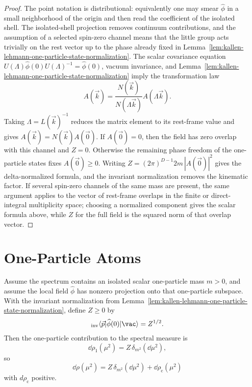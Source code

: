 \begin{proof}
The point notation is distributional: equivalently one may smear
\(\widehat\phi\) in a small neighborhood of the origin and then read the
coefficient of the isolated shell.  The isolated-shell projection removes
continuum contributions, and the assumption of a selected spin-zero channel
means that the little group acts trivially on the rest vector up to the phase
already fixed in
Lemma~\ref{lem:kallen-lehmann-one-particle-state-normalization}.
The scalar covariance equation
\(U(\Lambda)\widehat\phi(0)U(\Lambda)^{-1}=\widehat\phi(0)\), vacuum
invariance, and
Lemma~\ref{lem:kallen-lehmann-one-particle-state-normalization} imply
the transformation law
\[
  A(\vec k)
  =
  \frac{N(\vec k)}{N(\Lambda\vec k)}
  A(\Lambda\vec k).
\]
Taking
\(\Lambda=L(\vec k)^{-1}\) reduces the matrix element to its rest-frame value
and gives \(A(\vec k)=N(\vec k)A(\vec0)\).  If \(A(\vec0)=0\), then the field
has zero overlap with this channel and \(Z=0\).  Otherwise the remaining phase
freedom of the one-particle states fixes \(A(\vec0)\ge0\).  Writing
\(Z=(2\pi)^{D-1}2m\,|A(\vec0)|^2\) gives the delta-normalized formula, and
the invariant normalization removes the kinematic factor.  If several
spin-zero channels of the same mass are present, the same argument applies to
the vector of rest-frame overlaps in the finite or direct-integral
multiplicity space; choosing a normalized component gives the scalar formula
above, while \(Z\) for the full field is the squared norm of that overlap
vector.
\end{proof}

\section{One-Particle Atoms}

\begin{proposition}
\label{prop:kallen-lehmann-one-particle-atom}
Assume the spectrum contains an isolated scalar one-particle mass \(m>0\), and
assume the local field \(\widehat\phi\) has nonzero projection onto that
one-particle subspace.  With the invariant normalization from
Lemma~\ref{lem:kallen-lehmann-one-particle-state-normalization}, define
\(Z\ge0\) by
\[
  {}_{\rm inv}\langle\vec p|\widehat\phi(0)|\vac\rangle=Z^{1/2}.
\]
Then the one-particle contribution to the spectral measure is
\[
  \dd\rho_1(\mu^2)=Z\,\delta_{m^2}(\dd\mu^2),
\]
so
\[
  \dd\rho(\mu^2)
  =
  Z\,\delta_{m^2}(\dd\mu^2)
  +
  \dd\rho_{\mathrm c}(\mu^2)
\]
with \(d\rho_{\mathrm c}\) positive.
\end{proposition}

